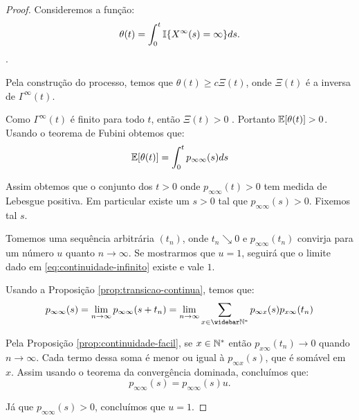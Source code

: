 \begin{proof}
  Consideremos a função:
  \begin{displaymath}
    \theta(t) = \int_0^t {\mathbb{I}} \{ X^\infty (s) = \infty \} ds.
  \end{displaymath}.
  
  Pela construção do processo, temos que $\theta(t) \geq c
  \Xi(t)$, onde $\Xi(t)$ é a inversa de $\Gamma^\infty(t)$.

  Como $\Gamma^\infty(t)$ é \qc finito para todo $t$, então $\Xi(t) >
  0$ \qc. Portanto ${\mathbb{E}} [\theta(t)] > 0$. Usando o teorema de Fubini
  obtemos que:
  \begin{displaymath}
    {\mathbb{E}}[\theta(t)] =  \int_0^t p_{\infty \infty} (s) ds
  \end{displaymath}

  Assim obtemos que o conjunto dos $t > 0$ onde $p_{\infty \infty}(t)
  > 0$ tem medida de Lebesgue positiva. Em particular existe um $s >
  0$ tal que $p_{\infty \infty}(s) > 0$. Fixemos tal $s$.

  Tomemos uma sequência arbitrária $(t_n)$, onde $t_n \searrow 0$ e
  $p_{\infty \infty} (t_n)$ convirja para um número $u$ quanto $n \to
  \infty$.  Se mostrarmos que $u = 1$, seguirá que o limite dado em
  \eqref{eq:continuidade-infinito} existe e vale $1$.


  Usando a Proposição \ref{prop:transicao-continua}, temos que:
  \begin{displaymath}
    p_{\infty\infty}(s) = \lim_{n \to \infty} p_{\infty \infty}(s+t_n) = \lim_{n \to
      \infty} \sum_{x \in \Nzb} p_{\infty x}(s) p_{x \infty} (t_n)
  \end{displaymath}

  Pela Proposição \ref{prop:continuidade-facil}, se $x \in {\mathbb{N^*}}$ então
  $p_{x \infty}(t_n) \to 0$ quando $n \to \infty$. Cada termo
  dessa soma é menor ou igual à $p_{\infty x} (s)$, que é somável em
  $x$. Assim usando o teorema da convergência dominada, concluímos
  que:
  \begin{displaymath}
    p_{\infty\infty}(s) = p_{\infty \infty}(s)u.
  \end{displaymath}

  Já que $p_{\infty \infty}(s) > 0$, concluímos que $u = 1$.
\end{proof}


